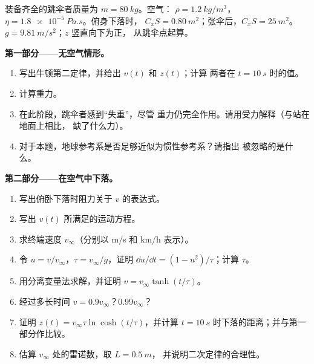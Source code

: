 \begin{problem}
\label{pb:b1:newton-dynamics:1}
装备齐全的跳伞者质量为 $m = \qty{80}{kg}$。空气：
$\rho = \qty{1.2}{kg/m^3}$，$\eta = \qty{1.8e-5}{Pa.s}$。俯身下落时，
$C_xS = \qty{0.80}{m^2}$；张伞后，$C_xS =
\qty{25}{m^2}$。$g = \qty{9.81}{m/s^2}$；$z$ 竖直向下为正，
从跳伞点起算。

\medskip
\noindent\textbf{第一部分——无空气情形。}
\begin{enumerate}
  \item 写出牛顿第二定律，并给出 $v(t)$ 和 $z(t)$；计算
        两者在 $t = \qty{10}{s}$ 时的值。
  \item 计算重力。
  \item 在此阶段，跳伞者感到“失重”，尽管
        重力仍完全作用。请用受力解释（与站在地面上相比，
        缺了什么力）。
  \item 对于本题，地球参考系是否足够近似为惯性参考系？请指出
        被忽略的是什么。
\end{enumerate}

\medskip
\noindent\textbf{第二部分——在空气中下落。}
\begin{enumerate}[resume]
  \item 写出俯卧下落时阻力关于 $v$ 的表达式。
  \item 写出 $v(t)$ 所满足的运动方程。
  \item 求终端速度 $v_\infty$（分别以 \unit{m/s} 和
        \unit{km/h} 表示）。
  \item 令 $u = v/v_\infty$，$\tau = v_\infty/g$，证明
        $\dd u/\dd t = (1 - u^2)/\tau$；计算 $\tau$。
  \item 用分离变量法求解，并证明
        $v = v_\infty\tanh(t/\tau)$。
  \item 经过多长时间 $v = 0.9v_\infty$？$0.99v_\infty$？
  \item 证明 $z(t) = v_\infty\tau\ln\cosh(t/\tau)$，并计算
        $t = \qty{10}{s}$ 时下落的距离；并与第一部分作比较。
  \item 估算 $v_\infty$ 处的雷诺数，取 $L = \qty{0.5}{m}$，
        并说明二次定律的合理性。
\end{enumerate}


\end{problem}
